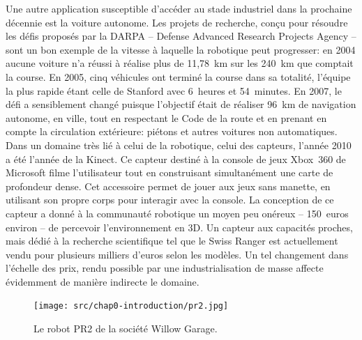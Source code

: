 Une autre application susceptible d'accéder au stade industriel dans
la prochaine décennie est la voiture autonome. Les projets de
recherche, conçu pour résoudre les défis proposés par la DARPA --
Defense Advanced Research Projects Agency -- sont un bon exemple de la
vitesse à laquelle la robotique peut progresser: en 2004 aucune
voiture n'a réussi à réalise plus de 11,78 km sur les 240 km que
comptait la course. En 2005, cinq véhicules ont terminé la course dans
sa totalité, l'équipe la plus rapide étant celle de Stanford avec
6 heures et 54 minutes. En 2007, le défi a sensiblement changé puisque
l'objectif était de réaliser 96 km de navigation autonome, en ville,
tout en respectant le Code de la route et en prenant en compte la
circulation extérieure: piétons et autres voitures non
automatiques. Dans un domaine très lié à celui de la robotique, celui
des capteurs, l'année 2010 a été l'année de la Kinect. Ce capteur
destiné à la console de jeux Xbox 360 de Microsoft filme l'utilisateur
tout en construisant simultanément une carte de profondeur dense. Cet
accessoire permet de jouer aux jeux sans manette, en utilisant son
propre corps pour interagir avec la console. La conception de ce
capteur a donné à la communauté robotique un moyen peu onéreux --
150 euros environ -- de percevoir l'environnement en 3D. Un capteur
aux capacités proches, mais dédié à la recherche scientifique tel que
le Swiss Ranger est actuellement vendu pour plusieurs milliers d'euros
selon les modèles. Un tel changement dans l'échelle des prix, rendu
possible par une industrialisation de masse affecte évidemment de
manière indirecte le domaine.


\begin{figure}
  \begin{center}
    \texttt{[image: src/chap0-introduction/pr2.jpg]}
  \end{center}
  \caption{Le robot PR2 de la société Willow Garage. \label{fig:pr2}}
\end{figure}


